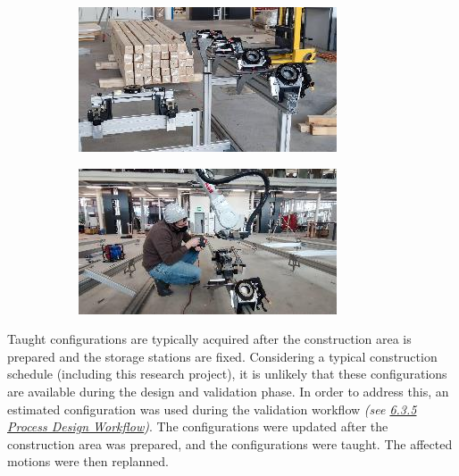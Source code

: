 \documentclass[11pt]{book}
\begin{document}
\begin{figure}[H]
\centering
\begin{subfigure}[b]{0.45\textwidth}
\centering
\includegraphics[width=\textwidth]{./images/image58.jpeg}
\end{subfigure}
\hfill
\begin{subfigure}[b]{0.45\textwidth}
\centering
\includegraphics[width=\textwidth]{./images/image59.jpeg}
\end{subfigure}
\end{figure}


Taught configurations are typically acquired after the construction area is prepared and the storage stations are fixed. Considering a typical construction schedule (including this research project), it is unlikely that these configurations are available during the design and validation phase. In order to address this, an estimated configuration was used during the validation workflow \textit{\textcolor[HTML]{B7B7B7}{(see \uline{6.3.5 Process Design Workflow})}}. The configurations were updated after the construction area was prepared, and the configurations were taught. The affected motions were then replanned.
\end{document}
